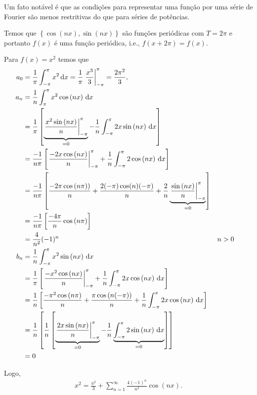 Um fato not\'{a}vel \'{e} que as condi\c{c}\~{o}es para representar uma fun\c{c}\~{a}o por uma s\'{e}rie de Fourier s\~{a}o menos restritivas do que para s\'{e}ries de pot\^{e}ncias.

\begin{obs}
    Temos que $\left\{ \cos\left( n x \right), \sin\left( n x \right) \right\}$ s\~{a}o fun\c{c}\~{o}es peri\'{o}dicas com $T = 2\pi$ e portanto $f(x)$ \'{e} uma fun\c{c}\~{a}o peri\'{o}dica, i.e., $f(x + 2\pi) = f(x)$.
\end{obs}

\begin{exem}
    Para $f(x) = x^2$ temos que
    \begin{align*}
        a_0 &= \frac{1}{\pi} \int_{-\pi}^\pi x^2 \, \mathrm{d}x = \frac{1}{\pi} \left. \frac{x^3}{3} \right|_{-\pi}^\pi = \frac{2 \pi^2}{3}, \\
        a_n &= \frac{1}{n} \int_{\pi}^\pi x^2 \cos\left( n x \right) \, \mathrm{d}x \\
        &= \frac{1}{\pi} \left[ \underbrace{\left. \frac{x^2 \sin\left( n x \right)}{n} \right|_{-\pi}^\pi}_{= 0} - \frac{1}{n} \int_{-\pi}^\pi 2 x \sin\left( n x \right) \, \mathrm{d}x \right] \\
        &= \frac{-1}{n \pi} \left[ \left. \frac{-2 x \cos\left( n x \right)}{n} \right|_{-\pi}^\pi + \frac{1}{n} \int_{-\pi}^\pi 2 \cos\left( n x \right) \, \mathrm{d}x \right] \\
        &= \frac{-1}{n \pi} \left[ \frac{-2 \pi \cos\left( n \pi) \right)}{n} + \frac{2 (-\pi) \cos(n) (-\pi)}{n} + \frac{2}{n} \underbrace{\left. \frac{\sin\left( n x \right)}{n} \right|_{-\pi}^\pi}_{= 0} \right] \\
        &= \frac{-1}{n \pi} \left[ \frac{- 4 \pi}{n} \cos\left( n \pi \right) \right] \\
        &= \frac{4}{n^2} (-1)^n && n > 0 \\
        b_n &= \frac{1}{n} \int_{-\pi}^\pi x^2 \sin\left( n x \right) \, \mathrm{d}x \\
        &= \frac{1}{\pi} \left[ \left. \frac{- x^2 \cos\left( n x \right)}{n} \right|_{-\pi}^\pi + \frac{1}{n} \int_{-\pi}^\pi 2 x \cos\left( n x \right) \, \mathrm{d}x \right] \\
        &= \frac{1}{n} \left[ \frac{-\pi^2 \cos\left( n \pi \right)}{n} + \frac{\pi \cos\left( n (-\pi) \right)}{n} + \frac{1}{n} \int_{-\pi}^\pi 2 x \cos\left( n x \right) \, \mathrm{d}x \right] \\ 
        &= \frac{1}{n} \left[ \frac{1}{n} \left[ \underbrace{\left. \frac{2 x \sin\left( n x \right)}{n} \right|_{-\pi}^\pi}_{= 0} - \frac{1}{n} \underbrace{\int_{-\pi}^\pi 2 \sin\left( n x \right) \, \mathrm{d}x}_{= 0} \right] \right] \\
        &= 0
    \end{align*}

    Logo,
    \begin{align*}
        x^2 = \frac{\pi^2}{3} + \sum_{n = 1}^\infty \frac{4 (-1)^n}{n^2} \cos\left( n x \right).
    \end{align*}
\end{exem}

